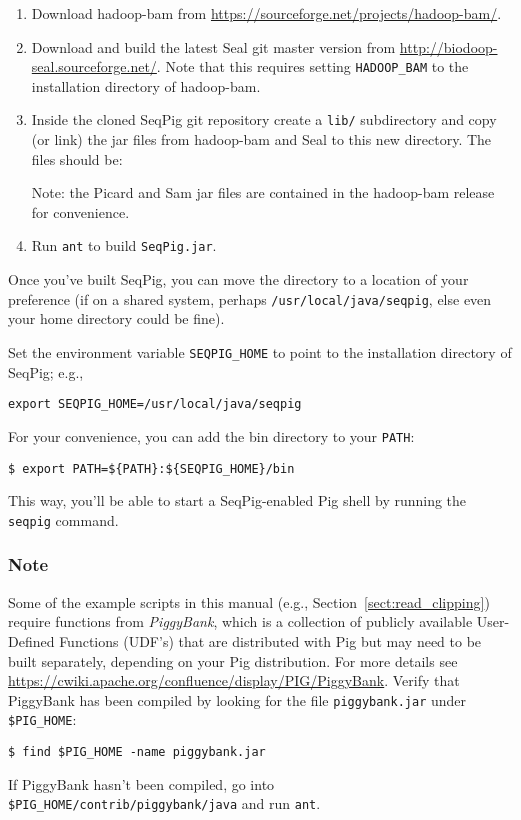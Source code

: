 \begin{enumerate}
\item Download hadoop-bam from \url{https://sourceforge.net/projects/hadoop-bam/}.

\item Download and build the latest Seal git master version from
 \url{http://biodoop-seal.sourceforge.net/}. Note that this requires setting
 {\tt HADOOP\_BAM} to the installation directory of hadoop-bam.

\item Inside the cloned SeqPig git repository create a
{\tt lib/} subdirectory and copy (or link) the jar files
from hadoop-bam and Seal to this new directory.  The files should be:
%
Note: the Picard and Sam jar files are contained in the hadoop-bam release
for convenience.

\item Run {\tt ant} to build {\tt SeqPig.jar}.
\end{enumerate}

Once you've built SeqPig, you can move the directory to a location of your
preference (if on a shared system, perhaps {\tt /usr/local/java/seqpig}, else
even your home directory could be fine).


Set the environment variable {\tt SEQPIG\_HOME} to point to the installation
directory of SeqPig; e.g.,
%
\begin{lstlisting} 
export SEQPIG_HOME=/usr/local/java/seqpig 
\end{lstlisting}
%

For your convenience, you can add the bin directory to your {\tt PATH}:
%
\begin{lstlisting} 
$ export PATH=${PATH}:${SEQPIG_HOME}/bin
\end{lstlisting}
%
This way, you'll be able to start a SeqPig-enabled Pig shell by running the {\tt
seqpig} command.

\subsubsection{Note}
\label{sect:piggybank_note}

Some of the example scripts in this manual (e.g.,
Section~\ref{sect:read_clipping}) require functions from \emph{PiggyBank},
which is a collection of publicly available User-Defined Functions (UDF's)
that are distributed with Pig but may need to be built separately, depending on
your Pig distribution.
For more details see
\url{https://cwiki.apache.org/confluence/display/PIG/PiggyBank}. Verify that
PiggyBank has been compiled by looking for the file {\tt piggybank.jar} under
{\tt \$PIG\_HOME}:
\begin{lstlisting} 
$ find $PIG_HOME -name piggybank.jar
\end{lstlisting}
If PiggyBank hasn't been compiled, go into {\tt
\$PIG\_HOME/contrib/piggybank/java} and run {\tt ant}.


